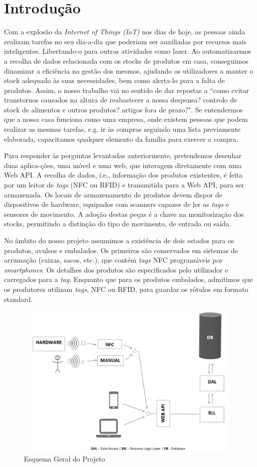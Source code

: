 %
%
\section*{Introdução} \label{Introducao}

Com a explosão da \textit{Internet of Things (IoT)} nos dias de hoje, as pessoas ainda realizam tarefas no seu dia-a-dia que poderiam ser auxiliadas por recursos mais inteligentes. Libertando-o para outras atividades como lazer. Ao automatizarmos a recolha de dados relacionada com os stocks de produtos em casa, conseguimos dinamizar a eficiência na gestão dos mesmos, ajudando os utilizadores a manter o stock adequado às suas necessidades, bem como alerta-lo para a falta de produtos. Assim, o nosso trabalho vai no sentido de dar repostas a ``como evitar transtornos causados na altura de reabastecer a nossa despensa? controlo de stock de alimentos e outros produtos? artigos fora de prazo?". Se entendermos que a nossa casa funciona como uma empresa, onde existem pessoas que podem realizar as mesmas tarefas, e.g. ir às compras seguindo uma lista previamente elaborada, capacitamos qualquer elemento da família para exercer a compra.

Para responder às perguntas levantadas anteriormente, pretendemos desenhar duas aplica-ções, uma móvel e uma web, que interagem diretamente com uma Web API. A recolha de dados, i.e., informação dos produtos existentes, é feita por um leitor de {\itshape tags} (NFC ou RFID) e transmitida para a Web API, para ser armazenada. Os locais de armazenamento de produtos devem dispor de dispositivos de hardware, equipados com scanners capazes de ler as {\itshape tags} e sensores de movimento. A adoção destas peças é a chave na monitorização dos stocks, permitindo a distinção do tipo de movimento, de entrada ou saída.

No âmbito do nosso projeto assumimos a existência de dois estados para os produtos, avulsos e embalados. Os primeiros são conservados em sistemas de arrumação (caixas, sacos, etc.), que contém {\itshape tags} NFC programáveis por {\itshape smartphones}. Os detalhes dos produtos são especificados pelo utilizador e carregados para a {\itshape tag}. Enquanto que para os produtos embalados, admitimos que os produtores utilizam {\itshape tags}, NFC ou RFID, para guardar os rótulos em formato standard.


\vspace{-15mm}
\hspace{2mm}

\begin{figure}[h!]
	\includegraphics[width=14cm,height=7.5cm,scale=0.5]{./figures/Esquema_Estrutura_Projeto_Geral.png}
	\caption{Esquema Geral do Projeto}
	\label{esquema_geral}
\end{figure}

